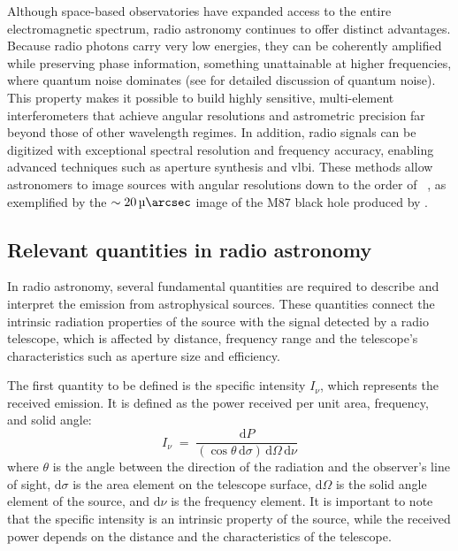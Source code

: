 Although space-based observatories have expanded access to the entire electromagnetic spectrum, radio astronomy continues to offer distinct advantages. Because radio photons carry very low energies, they can be coherently amplified while preserving phase information, something unattainable at higher frequencies, where quantum noise dominates (see \citealt{RevModPhys.82.1155} for detailed discussion of quantum noise). This property makes it possible to build highly sensitive, multi-element interferometers that achieve angular resolutions and astrometric precision far beyond those of other wavelength regimes. In addition, radio signals can be digitized with exceptional spectral resolution and frequency accuracy, enabling advanced techniques such as aperture synthesis and \gls{vlbi}. These methods allow astronomers to image sources with angular resolutions down to the order of \si{\micro\arcsec}, as exemplified by the $\sim\SI{20}{\micro\arcsec}$ image of the M87 black hole produced by \cite{Akiyama_2019}.
\subsection{Relevant quantities in radio astronomy}
In radio astronomy, several fundamental quantities are required to describe and interpret the emission from astrophysical sources. These quantities connect the intrinsic radiation properties of the source with the signal detected by a radio telescope, which is affected by distance, frequency range and the telescope's characteristics such as aperture size and efficiency.


The first quantity to be defined is the specific intensity $I_\nu$, which represents the received emission. It is defined as the power received per unit area, frequency, and solid angle:
\begin{equation}
	I_\nu \;=\; \frac{\mathrm{d}P}{ (\cos\theta \, \mathrm{d}\sigma) \, \mathrm{d}\Omega \, \mathrm{d}\nu}
\end{equation}
where $\theta$ is the angle between the direction of the radiation and the observer's line of sight, $\mathrm{d}\sigma$ is the area element on the telescope surface, $\mathrm{d}\Omega$ is the solid angle element of the source, and $\mathrm{d}\nu$ is the frequency element. It is important to note that the specific intensity is an intrinsic property of the source, while the received power depends on the distance and the characteristics of the telescope.



